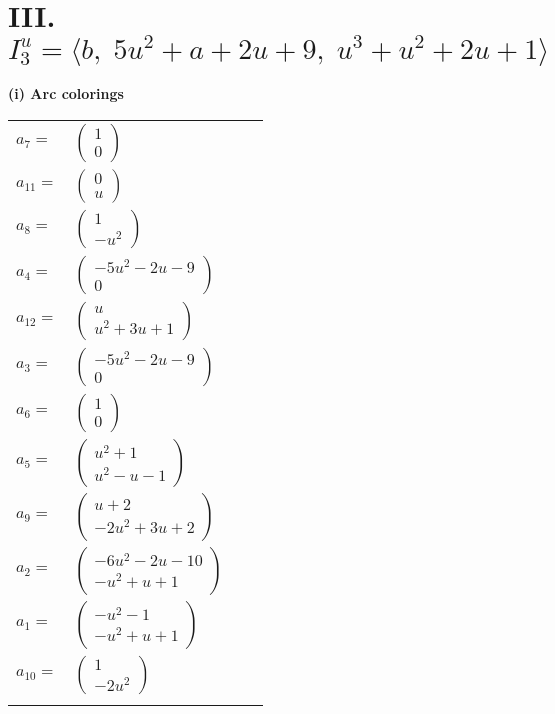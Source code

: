 \documentclass[1p]{elsarticle_modified}
\theoremstyle{definition}
\begin{document}
\centering \section*{III. $I^u_{3}= \langle b,\;5 u^2+a+2 u+9,\;u^3+u^2+2 u+1 \rangle$}
\flushleft \textbf{(i) Arc colorings}\\
\begin{tabular}{m{7pt} m{180pt} m{7pt} m{180pt} }
\flushright $a_{7}=$&$\begin{pmatrix}1\\0\end{pmatrix}$ \\
\flushright $a_{11}=$&$\begin{pmatrix}0\\u\end{pmatrix}$ \\
\flushright $a_{8}=$&$\begin{pmatrix}1\\- u^2\end{pmatrix}$ \\
\flushright $a_{4}=$&$\begin{pmatrix}-5 u^2-2 u-9\\0\end{pmatrix}$ \\
\flushright $a_{12}=$&$\begin{pmatrix}u\\u^2+3 u+1\end{pmatrix}$ \\
\flushright $a_{3}=$&$\begin{pmatrix}-5 u^2-2 u-9\\0\end{pmatrix}$ \\
\flushright $a_{6}=$&$\begin{pmatrix}1\\0\end{pmatrix}$ \\
\flushright $a_{5}=$&$\begin{pmatrix}u^2+1\\u^2- u-1\end{pmatrix}$ \\
\flushright $a_{9}=$&$\begin{pmatrix}u+2\\-2 u^2+3 u+2\end{pmatrix}$ \\
\flushright $a_{2}=$&$\begin{pmatrix}-6 u^2-2 u-10\\- u^2+u+1\end{pmatrix}$ \\
\flushright $a_{1}=$&$\begin{pmatrix}- u^2-1\\- u^2+u+1\end{pmatrix}$ \\
\flushright $a_{10}=$&$\begin{pmatrix}1\\-2 u^2\end{pmatrix}$\\&\end{tabular}
\end{document}
